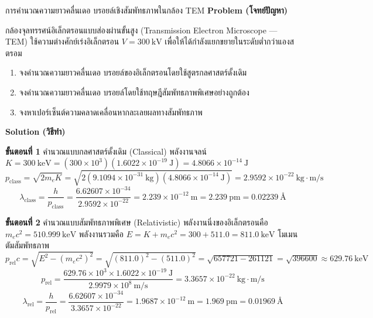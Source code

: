 \begin{psctbox}{การคำนวณความยาวคลื่นเดอ บรอยล์เชิงสัมพัทธภาพในกล้อง TEM}
\textbf{Problem (โจทย์ปัญหา)}

กล้องจุลทรรศน์อิเล็กตรอนแบบส่องผ่านขั้นสูง (Transmission Electron Microscope --- TEM) ใช้ความต่างศักย์เร่งอิเล็กตรอน $V = 300~\text{kV}$ เพื่อให้ได้กำลังแยกขยายในระดับต่ำกว่าแองสตรอม
\begin{enumerate}
    \item จงคำนวณความยาวคลื่นเดอ บรอยล์ของอิเล็กตรอนโดยใช้สูตรกลศาสตร์ดั้งเดิม
    \item จงคำนวณความยาวคลื่นเดอ บรอยล์โดยใช้ทฤษฎีสัมพัทธภาพพิเศษอย่างถูกต้อง
    \item จงหาเปอร์เซ็นต์ความคลาดเคลื่อนหากละเลยผลทางสัมพัทธภาพ
\end{enumerate}

\textbf{Solution (วิธีทำ)}

\textbf{ขั้นตอนที่ 1} คำนวณแบบกลศาสตร์ดั้งเดิม (Classical)
พลังงานจลน์ $K = 300~\text{keV} = (300 \times 10^3)(1.6022 \times 10^{-19}~\text{J}) = 4.8066 \times 10^{-14}~\text{J}$
\begin{equation*}
p_{\text{class}} = \sqrt{2 m_e K} = \sqrt{2(9.1094 \times 10^{-31}~\text{kg})(4.8066 \times 10^{-14}~\text{J})} = 2.9592 \times 10^{-22}~\text{kg}\cdot\text{m/s}
\end{equation*}
\begin{equation*}
\lambda_{\text{class}} = \frac{h}{p_{\text{class}}} = \frac{6.62607 \times 10^{-34}}{2.9592 \times 10^{-22}} = 2.239 \times 10^{-12}~\text{m} = 2.239~\text{pm} = 0.02239~\text{\AA}
\end{equation*}

\textbf{ขั้นตอนที่ 2} คำนวณแบบสัมพัทธภาพพิเศษ (Relativistic)
พลังงานนิ่งของอิเล็กตรอนคือ $m_e c^2 = 510.999~\text{keV}$ พลังงานรวมคือ $E = K + m_e c^2 = 300 + 511.0 = 811.0~\text{keV}$
โมเมนตัมสัมพัทธภาพ $p_{\text{rel}} c = \sqrt{E^2 - (m_e c^2)^2} = \sqrt{(811.0)^2 - (511.0)^2} = \sqrt{657721 - 261121} = \sqrt{396600} \approx 629.76~\text{keV}$
\begin{equation*}
p_{\text{rel}} = \frac{629.76 \times 10^3 \times 1.6022 \times 10^{-19}~\text{J}}{2.9979 \times 10^8~\text{m/s}} = 3.3657 \times 10^{-22}~\text{kg}\cdot\text{m/s}
\end{equation*}
\begin{equation*}
\lambda_{\text{rel}} = \frac{h}{p_{\text{rel}}} = \frac{6.62607 \times 10^{-34}}{3.3657 \times 10^{-22}} = 1.9687 \times 10^{-12}~\text{m} = 1.969~\text{pm} = 0.01969~\text{\AA}
\end{equation*}


\end{psctbox}
